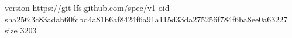 version https://git-lfs.github.com/spec/v1
oid sha256:3c83adab60fcbd4a81b6af8424f6a91a115d33da275256f784f6ba8ee0a63227
size 3203
